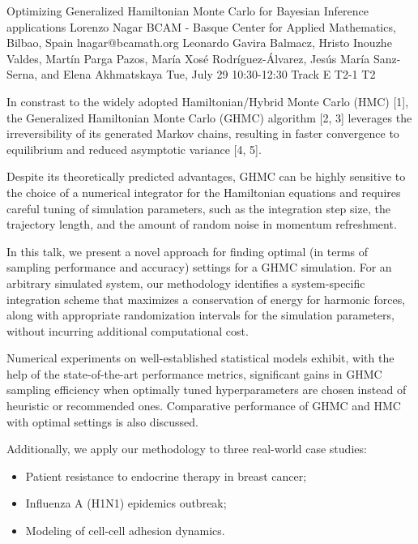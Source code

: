 \begin{talk}
  {Optimizing Generalized Hamiltonian Monte Carlo for Bayesian Inference applications}%
  {Lorenzo Nagar}%
  {BCAM - Basque Center for Applied Mathematics, Bilbao, Spain}%
  {lnagar@bcamath.org}%
  {Leonardo Gavira Balmacz, Hristo Inouzhe Valdes, Mart\'in Parga Pazos, Mar\'ia Xos\'e Rodr\'iguez-\'Alvarez, Jes\'us Mar\'ia Sanz-Serna, and Elena Akhmatskaya}%
  {}%
  {Tue, July 29 10:30-12:30 Track E}%
  {T2-1}%
  {T2}%
  
				
			
In constrast to the widely adopted Hamiltonian/Hybrid Monte Carlo (HMC) [1], the Generalized Hamiltonian Monte Carlo (GHMC) algorithm [2, 3] leverages the irreversibility of its generated Markov chains, resulting in faster convergence to equilibrium and reduced asymptotic variance [4, 5]. 

Despite its theoretically predicted advantages, GHMC can be highly sensitive to the choice of a numerical integrator for the Hamiltonian equations and requires careful tuning of simulation parameters, such as the integration step size, the trajectory length, and the amount of random noise in momentum refreshment.

In this talk, we present a novel approach for finding optimal (in terms of sampling performance and accuracy) settings for a GHMC simulation. For an arbitrary simulated system, our methodology identifies a system-specific integration scheme that maximizes a conservation of energy for harmonic forces, along with appropriate randomization intervals for the simulation parameters, without incurring additional computational cost.

Numerical experiments on well-established statistical models exhibit, with the help of the state-of-the-art performance metrics, significant gains in GHMC sampling efficiency when optimally tuned hyperparameters are chosen instead of heuristic or recommended ones. Comparative performance of GHMC and HMC with optimal settings is also discussed. 

Additionally, we apply our methodology to three real-world case studies:
\begin{itemize}
\item Patient resistance to endocrine therapy in breast cancer;
\item Influenza A (H1N1) epidemics outbreak;
\item Modeling of cell-cell adhesion dynamics.
\end{itemize}


\end{talk}
